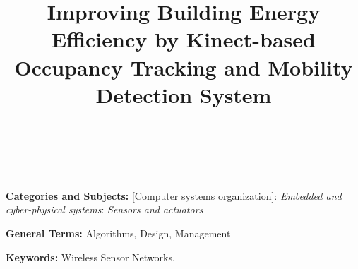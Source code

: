 \documentclass[preprint]{sig-alternate-10pt}
\begin{document}
\title{Improving Building Energy Efficiency by Kinect-based Occupancy
  Tracking and Mobility Detection System}

\author{\alignauthor  \ \\
 \\
}


\makeatletter
\let\@copyrightspace\relax
\makeatother

\pagestyle{plain}
\thispagestyle{plain}

\maketitle


\begin{abstract}

\end{abstract}


\noindent
{\bf Categories and Subjects:} {[Computer systems organization]}: {\em Embedded and cyber-physical systems}: {\em Sensors and actuators}

\noindent
{\bf General Terms: }Algorithms, Design, Management


\noindent
{\bf Keywords: }Wireless Sensor Networks.
\\














\end{document}
